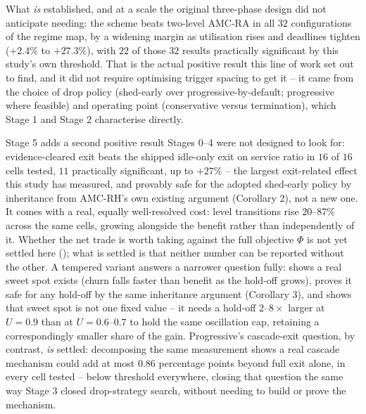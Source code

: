 \documentclass{article}
\begin{document}
What \emph{is} established, and at a scale the original three-phase design did
not anticipate needing: the scheme beats two-level AMC-RA in all $32$
configurations of the regime map, by a widening margin as utilisation rises
and deadlines tighten ($+2.4\%$ to $+27.3\%$), with $22$ of those $32$ results
practically significant by this study's own threshold. That is the actual
positive result this line of work set out to find, and it did not require
optimising trigger spacing to get it -- it came from the choice of drop policy
(shed-early over progressive-by-default; progressive where feasible) and
operating point (conservative versus termination), which Stage 1 and Stage 2
characterise directly.

Stage 5 adds a second positive result Stages 0--4 were not designed to look
for: evidence-cleared exit beats the shipped idle-only exit on service ratio
in $16$ of $16$ cells tested, $11$ practically significant, up to
$+27\%$ -- the largest exit-related effect this study has measured, and
provably safe for the adopted shed-early policy by inheritance from AMC-RH's
own existing argument (Corollary 2), not a new one. It comes with a real,
equally well-resolved cost: level transitions rise $20$--$87\%$ across the same
cells, growing alongside the benefit rather than independently of it. Whether
the net trade is worth taking against the full objective $\Phi$ is not yet
settled here (); what is settled is that neither number
can be reported without the other. A tempered variant answers a narrower
question fully:  shows a real sweet spot exists (churn
falls faster than benefit as the hold-off grows), proves it safe for any
hold-off by the same inheritance argument (Corollary 3), and shows that sweet
spot is not one fixed value -- it needs a hold-off $2$--$8\times$ larger at
$U=0.9$ than at $U=0.6$--$0.7$ to hold the same oscillation cap, retaining a
correspondingly smaller share of the gain. Progressive's cascade-exit
question, by
contrast, \emph{is} settled: decomposing the same measurement shows a real
cascade mechanism could add at most $0.86$ percentage points beyond full exit
alone, in every cell tested -- below threshold everywhere, closing that
question the same way Stage 3 closed drop-strategy search, without needing to
build or prove the mechanism.
\end{document}
